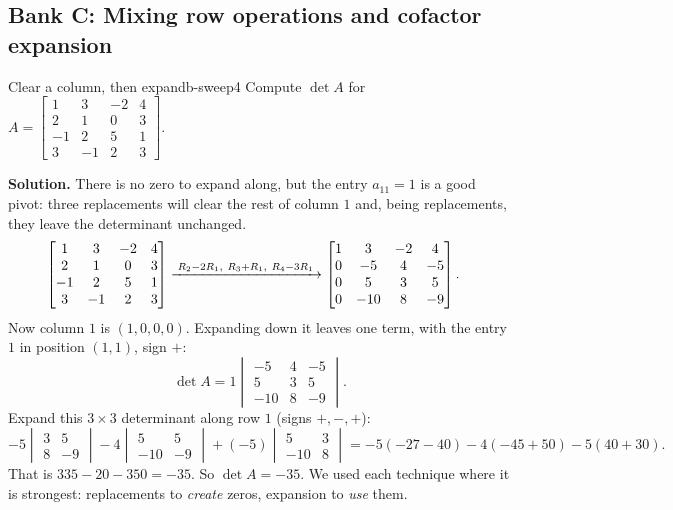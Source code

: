 \documentclass[11pt]{article}
\begin{document}
\subsection*{Bank C: Mixing row operations and cofactor expansion}

\begin{exmp}{Clear a column, then expand}{b-sweep4}
Compute $\det A$ for $A=\begin{bmatrix}1&3&-2&4\\2&1&0&3\\-1&2&5&1\\3&-1&2&3\end{bmatrix}$.

\textbf{Solution.} There is no zero to expand along, but the entry $a_{11}=1$ is a good pivot: three replacements will clear the rest of column $1$ and, being replacements, they leave the determinant unchanged.
\begin{align*}
\begin{bmatrix}1&3&-2&4\\2&1&0&3\\-1&2&5&1\\3&-1&2&3\end{bmatrix}
&\xrightarrow{\;R_2-2R_1,\ R_3+R_1,\ R_4-3R_1\;}
\begin{bmatrix}1&3&-2&4\\0&-5&4&-5\\0&5&3&5\\0&-10&8&-9\end{bmatrix}
.
\end{align*}
Now column $1$ is $(1,0,0,0)$. Expanding down it leaves one term, with the entry $1$ in position $(1,1)$, sign $+$:
\[
\det A=1\begin{vmatrix}-5&4&-5\\5&3&5\\-10&8&-9\end{vmatrix}.
\]
Expand this $3\times3$ determinant along row $1$ (signs $+,-,+$):
\[
-5\begin{vmatrix}3&5\\8&-9\end{vmatrix}-4\begin{vmatrix}5&5\\-10&-9\end{vmatrix}+(-5)\begin{vmatrix}5&3\\-10&8\end{vmatrix}=-5(-27-40)-4(-45+50)-5(40+30).
\]
That is $335-20-350=-35$. So $\det A=-35$. We used each technique where it is strongest: replacements to \emph{create} zeros, expansion to \emph{use} them.
\end{exmp}
\end{document}
